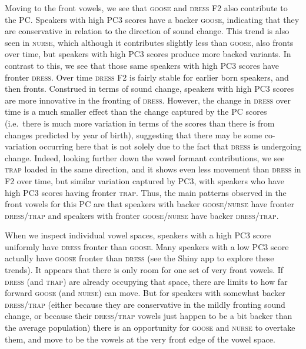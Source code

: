 \documentclass[review]{elsarticle} %
\begin{document}
Moving to the front vowels, we see that \textsc{goose} and \textsc{dress} F2 also contribute to the PC. Speakers with high PC3 scores have a backer \textsc{goose}, indicating that they are conservative in relation to the direction of sound change. This trend is also seen in \textsc{nurse}, which although it contributes slightly less than \textsc{goose}, also fronts over time, but speakers with high PC3 scores produce more backed variants. In contrast to this, we see that those same speakers with high PC3 scores have fronter \textsc{dress}. Over time \textsc{dress} F2 is fairly stable for earlier born speakers, and then fronts.  Construed in terms of sound change, speakers with high PC3 scores are more innovative in the fronting of \textsc{dress}.  However, the change in \textsc{dress} over time is a much smaller effect than the change captured by the PC scores (i.e.\ there is much more variation in terms of the scores than there is from changes predicted by year of birth), suggesting that there may be some co-variation occurring here that is not solely due to the fact that \textsc{dress} is undergoing change.  Indeed, looking further down the vowel formant contributions, we see \textsc{trap} loaded in the same direction, and it shows even less movement than \textsc{dress} in F2 over time, but similar variation captured by PC3, with speakers who have high PC3 scores having fronter \textsc{trap}. Thus, the main patterns observed in the front vowels for this PC are that speakers with backer \textsc{goose/nurse} have fronter \textsc{dress/trap} and speakers with fronter \textsc{goose/nurse} have backer \textsc{dress/trap}.

 When we inspect individual vowel spaces, speakers with a high PC3 score uniformly have \textsc{dress} fronter than \textsc{goose}.  Many speakers with a low PC3 score actually have \textsc{goose} fronter than \textsc{dress} (see the Shiny app to explore these trends).  It appears that there is only room for one set of very front vowels.  If \textsc{dress} (and \textsc{trap}) are already occupying that space, there are limits to how far forward \textsc{goose} (and \textsc{nurse}) can move.  But for speakers with somewhat backer \textsc{dress/trap} (either because they are conservative in the mildly fronting sound change, or because their \textsc{dress/trap} vowels just happen to be a bit backer than the average population) there is an opportunity for \textsc{goose} and \textsc{nurse} to overtake them, and move to be the vowels at the very front edge of the vowel space.
 
\end{document}
